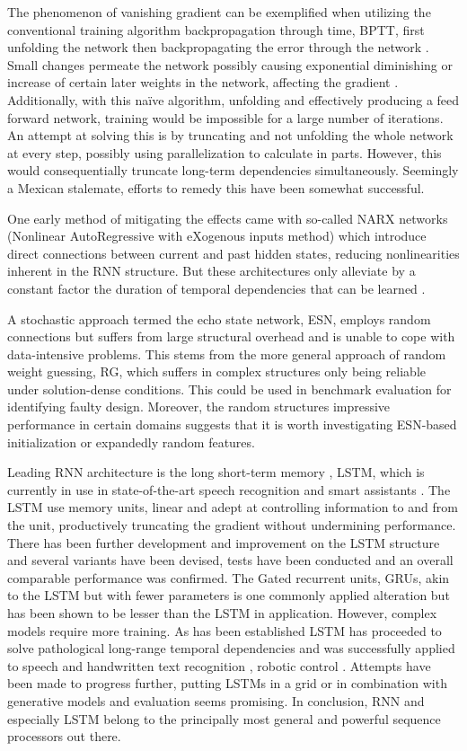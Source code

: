 The phenomenon of vanishing gradient can be exemplified when utilizing the conventional training algorithm backpropagation through time, BPTT, first unfolding the network then backpropagating the error through the network \cite{DRNNS}. Small changes permeate the network possibly causing exponential diminishing or increase of certain later weights in the network, affecting the gradient \cite{field}. Additionally, with this naïve algorithm, unfolding and effectively producing a feed forward network, training would be impossible for a large number of iterations. An attempt at solving this is by truncating and not unfolding the whole network at every step, possibly using parallelization to calculate in parts. However, this would consequentially truncate long-term dependencies simultaneously. Seemingly a Mexican stalemate, efforts to remedy this have been somewhat successful. 

One early method of mitigating the effects came with so-called NARX networks (Nonlinear AutoRegressive with eXogenous inputs method) \cite{DRNNS} which introduce direct connections between current and past hidden states, reducing nonlinearities inherent in the RNN structure. But these architectures only alleviate by a constant factor the duration of temporal dependencies that can be learned \cite{suts}.

A stochastic approach termed the echo state network, ESN, employs random connections but suffers from large structural overhead and is unable to cope with data-intensive problems. This stems from the more general approach of random weight guessing, RG, which suffers in complex structures only being reliable under solution-dense conditions. This could be used in benchmark evaluation for identifying faulty design. Moreover, the random structures impressive performance in certain domains suggests that it is worth investigating ESN-based initialization \cite{suts} or expandedly random features. 

Leading RNN architecture is the long short-term memory \cite{LSTM}, LSTM, which is currently in use in state-of-the-art speech recognition and smart assistants \cite{Apple}. The LSTM use memory units, linear and adept at controlling information to and from the unit, productively truncating the gradient without undermining performance. There has been further development and improvement on the LSTM structure and several variants have been devised, tests have been conducted and an overall comparable performance was confirmed\cite{Greff}. The Gated recurrent units, GRUs, akin to the LSTM but with fewer parameters is one commonly applied alteration but has been shown to be lesser than the LSTM in application. However, complex models require more training. As has been established LSTM has proceeded to solve pathological long-range temporal dependencies and was successfully applied to speech and handwritten text recognition \cite{gs, gas}, robotic control \cite{mayer}. Attempts have been made to progress further, putting LSTMs in a grid\cite{ka} or in combination with generative models and evaluation seems promising\cite{gr, ch, bo}. In conclusion, RNN and especially LSTM belong to the principally most general and powerful sequence processors out there.

